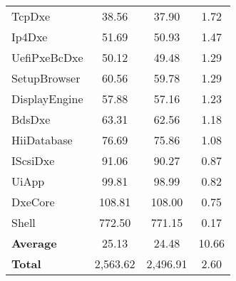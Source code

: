 \begin{longtable}{l c c c}
  TcpDxe & 38.56 & 37.90 & 1.72\\
  Ip4Dxe & 51.69 & 50.93 & 1.47\\
  UefiPxeBcDxe & 50.12 & 49.48 & 1.29\\
  SetupBrowser & 60.56 & 59.78 & 1.29\\
  DisplayEngine & 57.88 & 57.16 & 1.23\\
  BdsDxe & 63.31 & 62.56 & 1.18\\
  HiiDatabase & 76.69 & 75.86 & 1.08\\
  IScsiDxe & 91.06 & 90.27 & 0.87\\
  UiApp & 99.81 & 98.99 & 0.82\\
  DxeCore & 108.81 & 108.00 & 0.75\\
  Shell & 772.50 & 771.15 & 0.17\\
  \midrule
  \textbf{Average} & 25.13 & 24.48 & 10.66\\
  \textbf{Total} & 2,563.62 & 2,496.91 & 2.60\\
  \bottomrule
\end{longtable}


